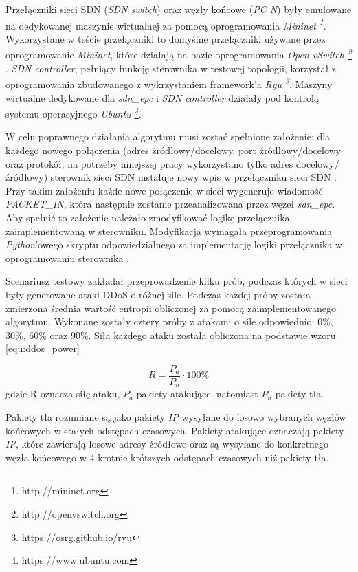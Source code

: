 Przełączniki sieci SDN (\textit{SDN switch}) oraz węzły końcowe (\textit{PC
  N}) były emulowane na dedykowanej maszynie wirtualnej za pomocą oprogramowania
\textit{Mininet \footnote{http://mininet.org}}. Wykorzystane w teście
przełączniki to domyślne przełączniki używane przez oprogramowanie
\textit{Mininet}, które działają na bazie oprogramowania
\textit{Open vSwitch \footnote{http://openvswitch.org}} \cite{mininetwiki}.
\textit{SDN controller}, pełniący funkcję sterownika w testowej topologii,
korzystał z oprogramowania zbudowanego z wykrzystaniem framework'a
\textit{Ryu \footnote{https://osrg.github.io/ryu}}. Maszyny wirtualne dedykowane
dla \textit{sdn\_epc} i \textit{SDN controller} działały pod kontrolą systemu
operacyjnego \textit{Ubuntu \footnote{https://www.ubuntu.com}}.

W celu poprawnego działania algorytmu musi zostać spełnione założenie: dla
każdego nowego połączenia (adres źródłowy/docelowy, port źródłowy/docelowy oraz
protokół; na potrzeby ninejszej pracy wykorzystano tylko adres
docelowy/źródłowy) sterownik sieci SDN instaluje nowy wpis w przełączniku
sieci SDN \cite{mainddosarticle}. Przy takim założeniu każde nowe połączenie w
sieci wygeneruje wiadomość \textit{PACKET\_IN}, która następnie zostanie
przeanalizowana przez węzeł \textit{sdn\_epc}. Aby spełnić to założenie należało
zmodyfikować logikę przełącznika zaimplementowaną w sterowniku. Modyfikacja
wymagała przeprogramowania \textit{Python}'owego skryptu odpowiedzialnego za
implementację logiki przełącznika w oprogramowaniu sterownika \cite{ryupage}.

Scenariusz testowy zakładał przeprowadzenie kilku prób, podczas których w sieci
były generowane ataki DDoS o różnej sile. Podczas każdej próby została zmierzona
średnia wartość entropii obliczonej za pomocą zaimplementowanego algorytmu.
Wykonane zostały cztery próby z atakami o sile odpowiednio: 0\%, 30\%, 60\% oraz
90\%. Siła każdego ataku została obliczona na podstawie wzoru
\ref{equ:ddos_power} \cite{mainddosarticle}

\begin{equation}
R = \frac{P_{a}}{P_{n}} \cdot 100\%
\label{equ:ddos_power}
\end{equation}
gdzie R oznacza siłę ataku, $P_{a}$ pakiety atakujące, natomiast $P_{n}$ pakiety
tła.

Pakiety tła rozumiane są jako pakiety \textit{IP} wysyłane do losowo wybranych
węzłów końcowych w stałych odstępach czasowych. Pakiety atakujące oznaczają
pakiety \textit{IP}, które zawierają losowe adresy źródłowe oraz są wysyłane do
konkretnego węzła końcowego w 4-krotnie krótszych odstępach czasowych niż
pakiety tła.

